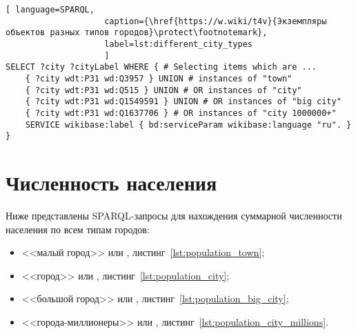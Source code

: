 \begin{lstlisting}[ language=SPARQL, 
                    caption={\href{https://w.wiki/t4v}{Экземпляры объектов разных типов городов}\protect\footnotemark},
                    label=lst:different_city_types
                    ]
SELECT ?city ?cityLabel WHERE { # Selecting items which are ...
	{ ?city wdt:P31 wd:Q3957 } UNION # instances of "town"
	{ ?city wdt:P31 wd:Q515 } UNION # OR instances of "city"
	{ ?city wdt:P31 wd:Q1549591 } UNION # OR instances of "big city"
	{ ?city wdt:P31 wd:Q1637706 } # OR instances of "city 1000000+"                                
	SERVICE wikibase:label { bd:serviceParam wikibase:language "ru". }
}
\end{lstlisting}


\section{Численность населения}

Ниже представлены SPARQL-запросы для нахождения суммарной численности населения по всем типам городов: 
\begin{itemize}
	\item <<малый город>> или , листинг~\ref{lst:population_town};
	\item <<город>> или , листинг~\ref{lst:population_city};
	\item <<большой город>> или , листинг~\ref{lst:population_big_city};
	\item <<города-миллионеры>> или , листинг~\ref{lst:population_city_millions}.
\end{itemize}
%




